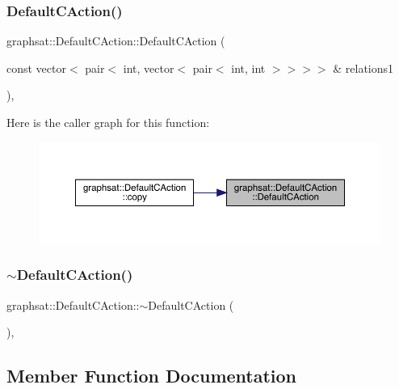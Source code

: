 \subsubsection{\texorpdfstring{DefaultCAction()}{DefaultCAction()}}
{\footnotesize\ttfamily graphsat\+::\+Default\+C\+Action\+::\+Default\+C\+Action (\begin{DoxyParamCaption}\item[{const vector$<$ pair$<$ int, vector$<$ pair$<$ int, int $>$$>$$>$$>$ \&}]{relations1 }\end{DoxyParamCaption})\hspace{0.3cm}{\ttfamily [inline]}, {\ttfamily [private]}}

Here is the caller graph for this function\+:
\nopagebreak
\begin{figure}[H]
\begin{center}
\leavevmode
\includegraphics[width=350pt]{classgraphsat_1_1_default_c_action_a12283e84a4da37280c1c8ac56a3564ec_icgraph}
\end{center}
\end{figure}
\mbox{\label{classgraphsat_1_1_default_c_action_a05af49386f59671eebee3b120dc0a086}} 
\subsubsection{\texorpdfstring{$\sim$DefaultCAction()}{~DefaultCAction()}}
{\footnotesize\ttfamily graphsat\+::\+Default\+C\+Action\+::$\sim$\+Default\+C\+Action (\begin{DoxyParamCaption}{ }\end{DoxyParamCaption})\hspace{0.3cm}{\ttfamily [inline]}, {\ttfamily [private]}}



\subsection{Member Function Documentation}
\mbox{\label{classgraphsat_1_1_default_c_action_a69fa305cacc678c4435bad7a101302aa}} 
